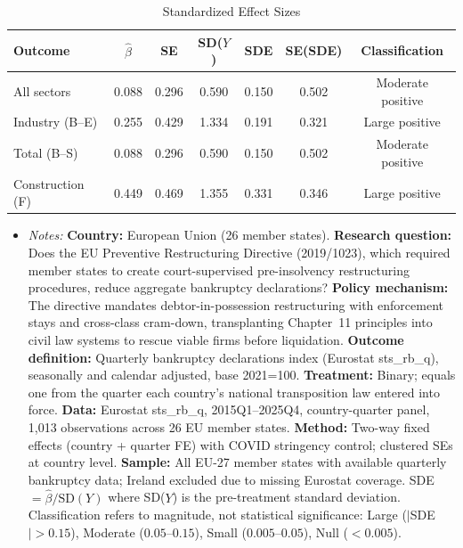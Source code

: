 \begin{table}[t]
\centering
\caption{Standardized Effect Sizes}
\label{tab:sde}
\begin{tabular}{lcccccc}
\hline\hline
Outcome & $\hat{\beta}$ & SE & SD($Y$) & SDE & SE(SDE) & Classification \\
\hline
All sectors & 0.088 & 0.296 & 0.590 & 0.150 & 0.502 & Moderate positive \\
Industry (B--E) & 0.255 & 0.429 & 1.334 & 0.191 & 0.321 & Large positive \\
Total (B--S) & 0.088 & 0.296 & 0.590 & 0.150 & 0.502 & Moderate positive \\
Construction (F) & 0.449 & 0.469 & 1.355 & 0.331 & 0.346 & Large positive \\
\hline\hline
\end{tabular}
\begin{itemize}[leftmargin=*]
\item \textit{Notes:} \textbf{Country:} European Union (26 member states). \textbf{Research question:} Does the EU Preventive Restructuring Directive (2019/1023), which required member states to create court-supervised pre-insolvency restructuring procedures, reduce aggregate bankruptcy declarations? \textbf{Policy mechanism:} The directive mandates debtor-in-possession restructuring with enforcement stays and cross-class cram-down, transplanting Chapter~11 principles into civil law systems to rescue viable firms before liquidation. \textbf{Outcome definition:} Quarterly bankruptcy declarations index (Eurostat sts\_rb\_q), seasonally and calendar adjusted, base 2021=100. \textbf{Treatment:} Binary; equals one from the quarter each country's national transposition law entered into force. \textbf{Data:} Eurostat sts\_rb\_q, 2015Q1--2025Q4, country-quarter panel, 1,013 observations across 26 EU member states. \textbf{Method:} Two-way fixed effects (country + quarter FE) with COVID stringency control; clustered SEs at country level. \textbf{Sample:} All EU-27 member states with available quarterly bankruptcy data; Ireland excluded due to missing Eurostat coverage. SDE $= \hat{\beta} / \text{SD}(Y)$ where SD($Y$) is the pre-treatment standard deviation. Classification refers to magnitude, not statistical significance: Large ($|$SDE$| > 0.15$), Moderate ($0.05$--$0.15$), Small ($0.005$--$0.05$), Null ($< 0.005$).
\end{itemize}
\end{table}
